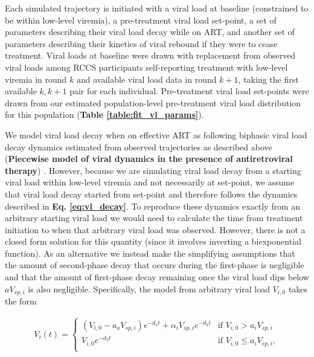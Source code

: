 \documentclass{article}[11pt]
\begin{document}
Each simulated trajectory is initiated with a viral load at baseline (constrained to be within low-level viremia), a pre-treatment viral load set-point, a set of parameters describing their viral load decay while on ART, and another set of parameters describing their kinetics of viral rebound if they were to cease treatment. Viral loads at baseline were drawn with replacement from observed viral loads among RCCS participants self-reporting treatment with low-level viremia in round $k$ and available viral load data in round $k+1$, taking the first available $k, k+1$ pair for each individual. Pre-treatment viral load set-points were drawn from our estimated population-level pre-treatment viral load distribution for this population (\textbf{Table \ref{table:fit_vl_params}}). 

We model viral load decay when on effective ART as following biphasic viral load decay dynamics estimated from observed trajectories as described above (\textbf{Piecewise model of viral dynamics in the presence of antiretroviral therapy}) \cite{andrade2013}. However, because we are simulating viral load decay from a starting viral load within low-level viremia and not necessarily at set-point, we assume that viral load decay started from set-point and therefore follows the dynamics described in \textbf{Eq. \ref{eq:vl_decay}}. To reproduce these dynamics exactly from an arbitrary starting viral load we would need to calculate the time from treatment initiation to when that arbitrary viral load was observed. However, there is not a closed form solution for this quantity (since it involves inverting a biexponential function). As an alternative we instead make the simplifying assumptions that the amount of second-phase decay that occurs during the first-phase is negligible and that the amount of first-phase decay remaining once the viral load dips below $aV_{sp,i}$ is also negligible. Specifically, the model from arbitrary viral load $V_{i,0}$ takes the form

\begin{align}
    V_i(t) = \begin{cases}
        (V_{i,0}-a_aV_{sp,i})e^{-d_1t} + \alpha_iV_{sp,i}e^{-d_2t} & \text{if } V_{i,0} > a_iV_{sp,i} \\
       V_{i,0}e^{-d_2t} & \text{if } V_{i,0} \leq a_iV_{sp,i}, \\
    \end{cases}
\end{align}
 
\end{document}
